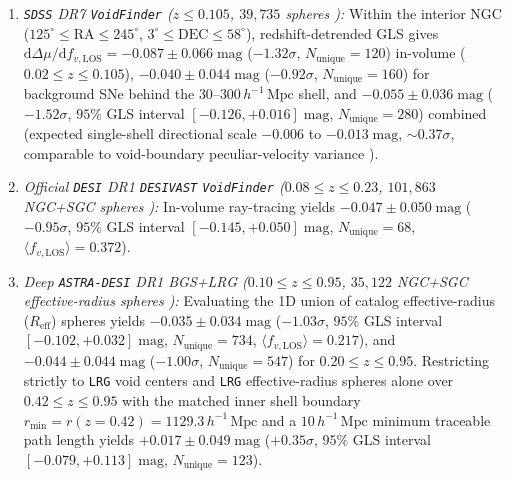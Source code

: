 \documentclass[11pt,a4paper]{article}
\begin{document}
\begin{enumerate}
    \item \textit{\texttt{SDSS} DR7 \texttt{VoidFinder} ($z \le 0.105$, $39,735$ spheres \cite{Douglass2023ApJS}):} Within the interior NGC ($125^\circ \le \mathrm{RA} \le 245^\circ$, $3^\circ \le \mathrm{DEC} \le 58^\circ$), redshift-detrended GLS gives $\mathrm{d}\Delta\mu/\mathrm{d}f_{v,\mathrm{LOS}} = -0.087 \pm 0.066\;\mathrm{mag}$ ($-1.32\sigma$, $N_{\mathrm{unique}} = 120$) in-volume ($0.02 \le z \le 0.105$), $-0.040 \pm 0.044\;\mathrm{mag}$ ($-0.92\sigma$, $N_{\mathrm{unique}} = 160$) for background SNe behind the $30\text{--}300\,h^{-1}\,\mathrm{Mpc}$ shell, and $-0.055 \pm 0.036\;\mathrm{mag}$ ($-1.52\sigma$, $95\%$ GLS interval $[-0.126, +0.016]\;\mathrm{mag}$, $N_{\mathrm{unique}} = 280$) combined (expected single-shell directional scale $-0.006$ to $-0.013\;\mathrm{mag}$, $\sim 0.37\sigma$, comparable to void-boundary peculiar-velocity variance \cite{Bolejko2013PRL}).
    \item \textit{Official \texttt{DESI} DR1 \texttt{DESIVAST} \texttt{VoidFinder} ($0.08 \le z \le 0.23$, $101,863$ NGC+SGC spheres \cite{DESIVAST2025}):} In-volume ray-tracing yields $-0.047 \pm 0.050\;\mathrm{mag}$ ($-0.95\sigma$, $95\%$ GLS interval $[-0.145, +0.050]\;\mathrm{mag}$, $N_{\mathrm{unique}} = 68$, $\langle f_{v,\mathrm{LOS}}\rangle = 0.372$).
    \item \textit{Deep \texttt{ASTRA-DESI} DR1 BGS+LRG ($0.10 \le z \le 0.95$, $35,122$ NGC+SGC effective-radius spheres \cite{ASTRADESI2025}):} Evaluating the 1D union of catalog effective-radius ($R_{\mathrm{eff}}$) spheres yields $-0.035 \pm 0.034\;\mathrm{mag}$ ($-1.03\sigma$, $95\%$ GLS interval $[-0.102, +0.032]\;\mathrm{mag}$, $N_{\mathrm{unique}} = 734$, $\langle f_{v,\mathrm{LOS}}\rangle = 0.217$), and $-0.044 \pm 0.044\;\mathrm{mag}$ ($-1.00\sigma$, $N_{\mathrm{unique}} = 547$) for $0.20 \le z \le 0.95$. Restricting strictly to \texttt{LRG} void centers and \texttt{LRG} effective-radius spheres alone over $0.42 \le z \le 0.95$ with the matched inner shell boundary $r_{\min} = r(z=0.42) = 1129.3\,h^{-1}\,\mathrm{Mpc}$ and a $10\,h^{-1}\,\mathrm{Mpc}$ minimum traceable path length yields $+0.017 \pm 0.049\;\mathrm{mag}$ ($+0.35\sigma$, $95\%$ GLS interval $[-0.079, +0.113]\;\mathrm{mag}$, $N_{\mathrm{unique}} = 123$).
\end{enumerate}
\end{document}
